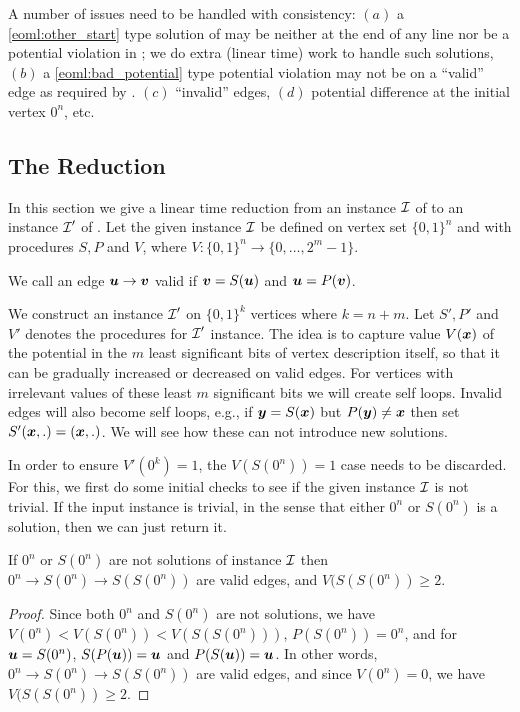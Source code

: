 A number of issues need to be handled with consistency: $(a)$
a \ref{eoml:other_start} type solution of \EOML may be neither at the end of any line nor be a 
potential violation in \EOPL; we do extra (linear time) work to handle such
solutions, $(b)$ a \ref{eoml:bad_potential} type potential violation may not be on a ``valid'' edge as
required by \EOPL. $(c)$ ``invalid'' edges, $(d)$ potential difference at the
initial vertex $0^n$, etc.

\subsection{The Reduction}
In this section we give a linear time reduction from an instance $\mbox{${\mathcal I}$}$ of \EOPL to an instance $\mbox{${\mathcal I}$}'$ of \EOML. Let the given \EOPL instance $\mbox{${\mathcal I}$}$ be defined on vertex set $\{0,1\}^n$ and with procedures $S,P$ and $V$, where $V:\{0,1\}^n\rightarrow \{0,\dots,2^m-1\}$.

\medskip

 We call an edge $\mbox{\boldmath $u$} \rightarrow \mbox{\boldmath $v$}$ valid if $\mbox{\boldmath $v$}=S(\mbox{\boldmath $u$})$ and $\mbox{\boldmath $u$}=P(\mbox{\boldmath $v$})$. 
\medskip

We construct an \EOML instance $\mbox{${\mathcal I}$}'$ on $\{0,1\}^k$ vertices where $k=n+m$. 
Let $S',P'$ and $V'$ denotes the procedures for $\mbox{${\mathcal I}$}'$ instance. 
The idea is to capture value $V(\mbox{\boldmath $x$})$ of the potential in the $m$ least significant bits of vertex description itself, so that it can be gradually increased or decreased on valid edges. For vertices with irrelevant values of these least $m$ significant bits we will create self loops. Invalid edges will also become self loops, e.g., if $\mbox{\boldmath $y$}=S(\mbox{\boldmath $x$})$ but $P(\mbox{\boldmath $y$})\neq \mbox{\boldmath $x$}$ then set $S'(\mbox{\boldmath $x$},.)=(\mbox{\boldmath $x$},.)$. We will see how these can not introduce new solutions. 

%
In order to ensure $V'(0^k)=1$, the $V(S(0^n))=1$ case needs to be discarded. For
this, we first do some initial checks to see if the given instance $\mbox{${\mathcal I}$}$ is not
trivial.  If the input \EOPL instance is trivial, in the sense that either
$0^n$ or $S(0^n)$ is a solution, then we can just return it.

\begin{lemma}
\label{lem:valid-edges}
If $0^n$ or $S(0^n)$ are not solutions of \EOPL instance $\mbox{${\mathcal I}$}$ then $0^n
\rightarrow S(0^n) \rightarrow S(S(0^n))$ are valid edges, and $V(S(S(0^n))\ge 2$. 
\end{lemma}

\begin{proof}
Since both $0^n$ and $S(0^n)$ are not solutions, we have
	$V(0^n)<V(S(0^n))<V(S(S(0^n)))$, $P(S(0^n))=0^n$, and for $\mbox{\boldmath $u$} = S(0^n)$,
	$S(P(\mbox{\boldmath $u$}))=\mbox{\boldmath $u$}$ and $P(S(\mbox{\boldmath $u$}))=\mbox{\boldmath $u$}$. In other words, $0^n \rightarrow S(0^n)
	\rightarrow S(S(0^n))$ are valid edges, and since $V(0^n)=0$, we have
	$V(S(S(0^n))\ge 2$. 
\end{proof}

